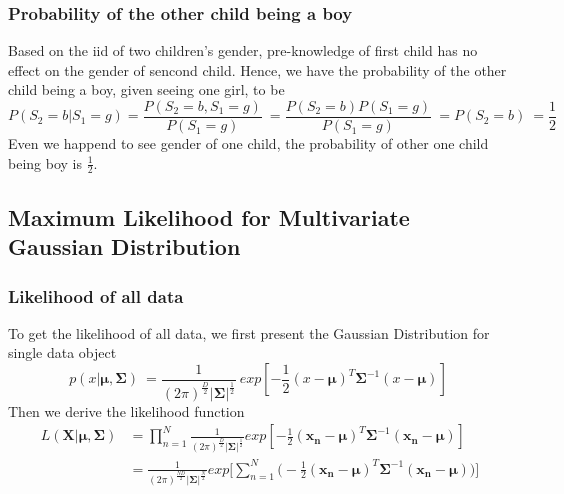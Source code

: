 \documentclass[11pt,a4paper]{article}
\newcommand{\htab}{\hspace*{0.63cm}}
\newcommand{\bmu}{\boldsymbol{\mu}}
\newcommand{\bsum}{\boldsymbol{\Sigma}}
\newcommand{\xnv}{\boldsymbol{x_{n}}}
\begin{document}
\subsubsection{Probability of the other child being a boy}
\htab Based on the iid of two children's gender, pre-knowledge of first child has no effect on the gender of sencond child. Hence, we have the probability of the other child being a boy, given seeing one girl, to be
    \begin{equation}
        P(S_{2} = b | S_{1} = g) = \frac{P(S_{2} = b, S_{1} = g)}{P(S_{1} = g)} \ 
        = \frac{P(S_{2} = b) P(S_{1} = g)}{P(S_{1} = g)} \
        = P(S_{2} = b) \ 
        = \frac{1}{2}
    \end{equation} 
\htab Even we happend to see gender of one child, the probability of other one child being boy is $\frac{1}{2}$.
\newpage
\subsection{Maximum Likelihood for Multivariate Gaussian Distribution}
\subsubsection{Likelihood of all data}
\htab To get the likelihood of all data, we first present the Gaussian Distribution for single data object
    \begin{equation} 
        p(x|\bmu, \bsum) \ 
        = \frac{1}{(2\pi)^{\frac{D}{2}} |\bsum|^{\frac{1}{2}}}  \
            exp[-\frac{1}{2} (x-\bmu)^{T} \bsum^{-1} (x-\bmu)] \ 
    \end{equation}
\htab Then we derive the likelihood function
    \begin{equation} 
        \begin{aligned}
    L(\boldsymbol{X}|\bmu,\bsum) 
    & = \prod_{n=1}^{N} \frac{1}{(2\pi)^{\frac{D}{2}} |\bsum|^{\frac{1}{2}}}  
            exp[-\frac{1}{2} (\xnv-\bmu)^{T} \bsum^{-1} (\xnv-\bmu)]  \\
    & =  \frac{1}{(2\pi)^{\frac{ND}{2}} |\bsum|^{\frac{N}{2}}} 
        exp\Big[\sum_{n=1}^{N} \Big(-\frac{1}{2} (\xnv-\bmu)^{T} \bsum^{-1} (\xnv-\bmu) \Big) \Big]
    \end{aligned}
    \end{equation} 
\end{document}
